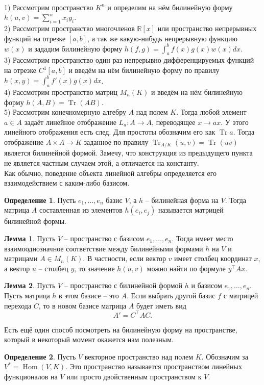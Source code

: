 \documentclass[10pt,a4paper,oneside]{book} %
\theoremstyle{definition}
\newtheorem*{defn}{Определение}
\newtheorem{lem}{Лемма}
\newcommand{\mb}[1]{\mathbb{#1}}
\newcommand{\Tr}{\operatorname{Tr}}
\newcommand{\tr}{\operatorname{Tr}}
\newcommand{\Hom}{\operatorname{Hom}}
\def\exm{\noindent {\bf Примеры:}}
\def\dfn{\begin{defn}}
\def\edfn{\end{defn}}
\def\lm{\begin{lem}}
\def\elm{\end{lem}}
\begin{document}
\exm\\
1) Рассмотрим пространство $K^n$ и определим на нём билинейную форму $h(u,v)=\sum_{i=1}^n x_iy_i$.\\
2) Рассмотрим пространство многочленов $\mb R[x]$ или пространство непрерывных функций на отрезке $[a,b]$, а так же какую-нибудь непрерывную функцию $w(x)$ и зададим билинейную форму $h(f,g)=\int_a^b f(x)g(x)w(x)dx$.\\
3) Рассмотрим пространство один раз непрерывно дифференцируемых функций на отрезке $C^1[a,b]$ и введём на нём билинейную форму по правилу $h(x,y)=\int_a^b f'(x)g(x)dx$.\\
4) Рассмотрим пространство матриц $M_n(K)$ и введём на нём билинейную форму $h(A,B)= \Tr(AB)$.\\
5) Рассмотрим конечномерную алгебру $A$ над полем $K$. Тогда любой элемент $a\in A$ задаёт линейное отображение $L_a \colon A \to A$, переводящее $x\to ax$. У этого линейного отображения есть след. Для простоты обозначим его как $\tr a$.
Тогда отображение $A\times A \to K$ заданное по правилу $\tr_{A/K}(u,v)=\tr(uv)$ является билинейной формой. Замечу, что конструкция из предыдущего пункта не является частным случаем этой, а отличается на константу.\\

Как обычно, поведение объекта линейной алгебры определяется его взаимодействием с каким-либо базисом.

\dfn Пусть $e_1, \dots, e_n$ базис $V$, а $h$ -- билинейная форма на $V$. Тогда матрица $A$ составленная из элементов $h(e_i,e_j)$ называется матрицей билинейной формы.
\edfn

\lm Пусть $V$ -- пространство с  базисом $e_1,\dots,e_n$. Тогда имеет место взаимооднозначное соответствие между билинейными формами $h$ на $V$ и матрицами  $A\in M_n(K)$. В частности, если вектор $v$ имеет столбец координат $x$, а вектор $u$ -- столбец $y$, то значение $h(u,v)$ можно найти по формуле $y^{\top}Ax$.
\elm

\lm Пусть $V$ -- пространство с билинейной формой $h$ и базисом $e_1,\dots,e_n$. Пусть матрица $h$ в этом базисе -- это $A$. Если выбрать другой базис $f$ с матрицей перехода $C$, то в новом базисе матрица $A$ будет иметь вид 
$$A'=C^{\top}AC.$$
\elm

Есть ещё один способ посмотреть на билинейную форму на пространстве, который в некоторый момент окажется нам полезным.


\begin{defn} Пусть $V$ векторное пространство над полем $K$. Обозначим за $V^{*}=\Hom(V,K)$. Это пространство называется пространством линейных функционалов на $V$ или просто двойственным пространством к $V$. 
\end{defn}
\end{document}
